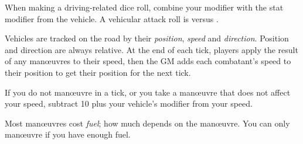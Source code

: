 
When making a driving-related dice roll, combine your  modifier with the stat modifier from the vehicle. A vehicular attack roll is  versus .

Vehicles are tracked on the road by their \emph{position}, \emph{speed} and \emph{direction}. Position and direction are always relative. At the end of each tick, players apply the result of any man\oe{}uvres to their speed, then the GM adds each combatant's speed to their position to get their position for the next tick.

If you do not man\oe{}uvre in a tick, or you take a man\oe{}uvre that does not affect your speed, subtract 10 plus your vehicle's  modifier from your speed.

Most man\oe{}uvres cost \emph{fuel}; how much depends on the man\oe{}uvre. You can only man\oe{}uvre if you have enough fuel.

